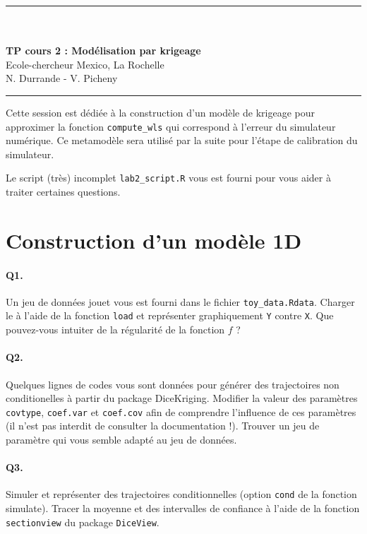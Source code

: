 \documentclass[12pt]{scrartcl}
\begin{document}
\begin{center}
	\rule{\textwidth}{1pt}
	\\ \ \\
	{\LARGE \textbf{TP cours 2 : Modélisation par krigeage}}\\
	\vspace{3mm}
	{\large Ecole-chercheur Mexico, La Rochelle \\ \vspace{3mm}}
	{\normalsize N. Durrande - V. Picheny}\\
	\vspace{3mm}
	\rule{\textwidth}{1pt}
	\vspace{5mm}
\end{center}
Cette session est dédiée à la construction d'un modèle de krigeage pour approximer la fonction  \texttt{compute\_wls} qui correspond à l'erreur du simulateur numérique. Ce metamodèle sera utilisé par la suite pour l'étape de calibration du simulateur.

Le script (très) incomplet \texttt{lab2\_script.R} vous est fourni pour vous aider à traiter certaines questions.

\section{Construction d'un modèle 1D}

\paragraph{Q1.} Un jeu de données jouet vous est fourni dans le fichier \texttt{toy\_data.Rdata}. Charger le à l'aide de la fonction \texttt{load} et représenter graphiquement \texttt{Y} contre \texttt{X}. Que pouvez-vous intuiter de la régularité de la fonction $f$ ?

\paragraph{Q2.} Quelques lignes de codes vous sont données pour générer des trajectoires non conditionelles à partir du package DiceKriging. Modifier la valeur des paramètres \texttt{covtype}, \texttt{coef.var} et \texttt{coef.cov} afin de comprendre l'influence de ces paramètres (il n'est pas interdit de consulter la documentation !). Trouver un jeu de paramètre qui vous semble adapté au jeu de données.

\paragraph{Q3.} Simuler et représenter des trajectoires conditionnelles (option \texttt{cond} de la fonction simulate). Tracer la moyenne et des intervalles de confiance à l'aide de la fonction \texttt{sectionview} du package \texttt{DiceView}.
\end{document}
